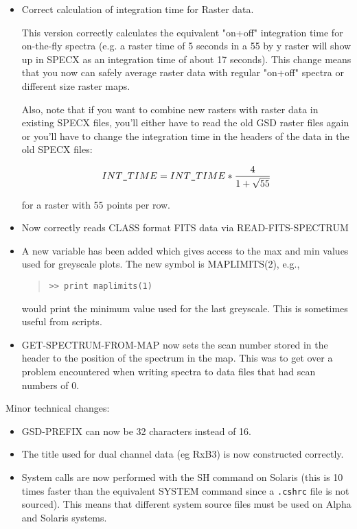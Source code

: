 \documentclass[twoside,11pt]{article}
\renewcommand{\_}{\texttt{\symbol{95}}}
\newenvironment{myquote}{\begin{quote}\begin{small}}{\end{small}\end{quote}}
\begin{document}
\begin{itemize}
\item Correct calculation of integration time for Raster data.

     This version correctly calculates the equivalent "on+off"
     integration time for on-the-fly spectra (e.g. a raster time of 5
     seconds in a 55 by y raster will show up in SPECX as an
     integration time of about 17 seconds). This change means that you
     now can safely average raster data with regular "on+off" spectra
     or different size raster maps.

     Also, note that if you want to combine new rasters with raster
     data in existing SPECX files, you'll either have to read the old
     GSD raster files again or you'll have to change the integration
     time in the headers of the data in the old SPECX files:

\[
         INT\_TIME = INT\_TIME * \frac{4}{1+\sqrt{55}}
\]

     for a raster with 55 points per row.

\item Now correctly reads CLASS format FITS data via READ-FITS-SPECTRUM

\item A new variable has been added which gives access to the max and min
     values used for greyscale plots. The new symbol is MAPLIMITS(2), e.g.,
\begin{myquote}
\begin{verbatim}
>> print maplimits(1)
\end{verbatim}
\end{myquote}

   would print the minimum value used for the last greyscale.
     This is sometimes useful from scripts.

\item GET-SPECTRUM-FROM-MAP now sets the scan number stored in the header
     to the position of the spectrum in the map. This was to get over
     a problem encountered when writing spectra to data files that had
     scan numbers of 0.

\end{itemize}

Minor technical changes:

\begin{itemize}

\item GSD-PREFIX can now be 32 characters instead of 16.

\item The title used for dual channel data (eg RxB3) is now constructed 
      correctly.

\item System calls are now performed with the SH command on Solaris
      (this is 10 times faster than the equivalent SYSTEM command
      since a \texttt{.cshrc} file is not sourced).  This means that different 
      system source files must be used on Alpha and Solaris systems.

\end{itemize}
\end{document}
